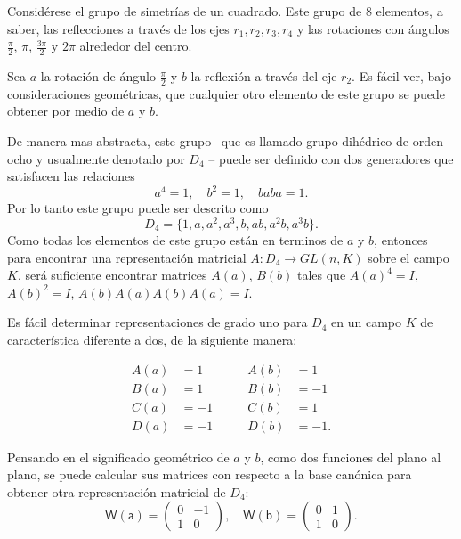 \begin{ejemplo}[Representación de $D_4$]
Considérese el grupo de simetrías de un cuadrado. Este grupo de 8 elementos, a saber, las reflecciones a través de los ejes $r_1, r_2, r_3, r_4$ y las rotaciones con ángulos $\frac{\pi}{2}$, $\pi$, $\frac{3\pi}{2}$ y $2\pi$ alrededor del centro.  

Sea $a$ la rotación de ángulo $\frac{\pi}{2}$ y $b$ la reflexión a través del eje $r_2$. Es fácil ver, bajo consideraciones geométricas, que cualquier otro elemento de este grupo se puede obtener por medio de $a$ y $b$.

De manera mas abstracta, este grupo --que es llamado grupo dihédrico de orden ocho y usualmente denotado por $D_4$ -- puede ser definido con dos generadores que satisfacen las relaciones
\[ a^4 = 1, \quad b^2 = 1 , \quad baba = 1.  \]
Por lo tanto este grupo puede ser descrito  como 
\[  D_4 = \{ 1, a, a^2, a^3, b, ab, a^2b, a^3b \}. \]
Como todas los elementos de este grupo están en terminos de $a$ y $b$, entonces para encontrar una representación matricial $A \colon D_4 \to GL(n,K)$ sobre el campo $K$, será suficiente encontrar matrices $A(a)$, $B(b)$ tales que $A(a)^4 = I$, $A(b)^2 = I$, $A(b)A(a)A(b)A(a) = I.$

Es fácil determinar representaciones de grado uno para $D_4$ en un campo $K$ de característica diferente a dos, de la siguiente manera:

\begin{equation*}
\begin{aligned}
A(a) & = 1\\
B(a) & = 1 \\ 
C(a) & = -1 \\
D(a) & = -1
\end{aligned}
\qquad 
\begin{aligned}
A(b) & = 1\\
B(b) & =  -1 \\
C(b) & = 1 \\
D(b) & = -1.
\end{aligned}
\end{equation*}

Pensando en el significado geométrico de $a$ y $b$, como dos funciones del plano al plano, se puede calcular sus matrices con respecto a la base canónica para obtener otra representación matricial de $D_4$:
\[ \mathsf{W(a)} = \begin{pmatrix}
0 & -1 \\
1 & 0
\end{pmatrix}, \quad
\mathsf{W(b)} = \begin{pmatrix}
 0 & 1 \\
 1 & 0
\end{pmatrix}. \]

\end{ejemplo}

